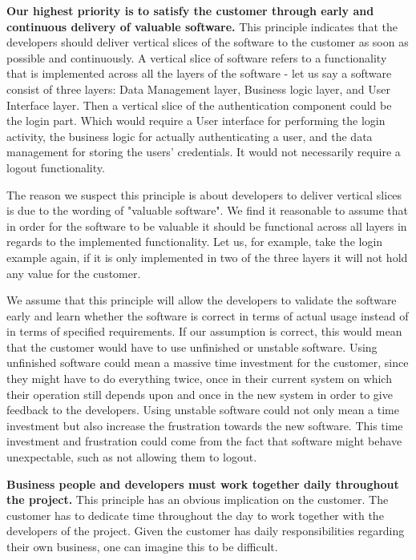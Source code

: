 \textbf{Our highest priority is to satisfy the customer through early and continuous delivery of valuable software.}
This principle indicates that the developers should deliver vertical slices of the software to the customer as soon as possible and continuously.
A vertical slice of software refers to a functionality that is implemented across all the layers of the software - let us say a software consist of three layers: Data Management layer, Business logic layer, and User Interface layer. 
Then a vertical slice of the authentication component could be the login part. Which would require a User interface for performing the login activity, the business logic for actually authenticating a user, and the data management for storing the users' credentials. It would not necessarily require a logout functionality.

The reason we suspect this principle is about developers to deliver vertical slices is due to the wording of "valuable software". 
We find it reasonable to assume that in order for the software to be valuable it should be functional across all layers in regards to the implemented functionality. 
Let us, for example, take the login example again, if it is only implemented in two of the three layers it will not hold any value for the customer.

We assume that this principle will allow the developers to validate the software early and learn whether the software is correct in terms of actual usage instead of in terms of specified requirements.
If our assumption is correct, this would mean that the customer would have to use unfinished or unstable software.
Using unfinished software could mean a massive time investment for the customer, since they might have to do everything twice, once in their current system on which their operation still depends upon and once in the new system in order to give feedback to the developers.
Using unstable software could not only mean a time investment but also increase the frustration towards the new software.
This time investment and frustration could come from the fact that software might behave unexpectable, such as not allowing them to logout.

\textbf{Business people and developers must work together daily throughout the project.}
This principle has an obvious implication on the customer.
The customer has to dedicate time throughout the day to work together with the developers of the project.
Given the customer has daily responsibilities regarding their own business, one can imagine this to be difficult.

